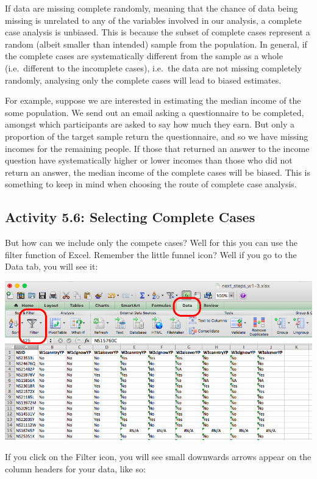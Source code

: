 \documentclass[
]{book}
\begin{document}
If data are missing complete randomly, meaning that the chance of data being missing is unrelated to any of the variables involved in our analysis, a complete case analysis is unbiased. This is because the subset of complete cases represent a random (albeit smaller than intended) sample from the population. In general, if the complete cases are systematically different from the sample as a whole (i.e.~different to the incomplete cases), i.e.~the data are not missing completely randomly, analysing only the complete cases will lead to biased estimates.

For example, suppose we are interested in estimating the median income of the some population. We send out an email asking a questionnaire to be completed, amongst which participants are asked to say how much they earn. But only a proportion of the target sample return the questionnaire, and so we have missing incomes for the remaining people. If those that returned an answer to the income question have systematically higher or lower incomes than those who did not return an answer, the median income of the complete cases will be biased. This is something to keep in mind when choosing the route of complete case analysis.

\hypertarget{activity-5.6-selecting-complete-cases}{%
\subsection{Activity 5.6: Selecting Complete Cases}\label{activity-5.6-selecting-complete-cases}}

But how can we include only the compete cases? Well for this you can use the filter function of Excel. Remember the little funnel icon? Well if you go to the Data tab, you will see it:

\includegraphics{imgs/cc_filter.png}

If you click on the Filter icon, you will see small downwards arrows appear on the column headers for your data, like so:
\end{document}
